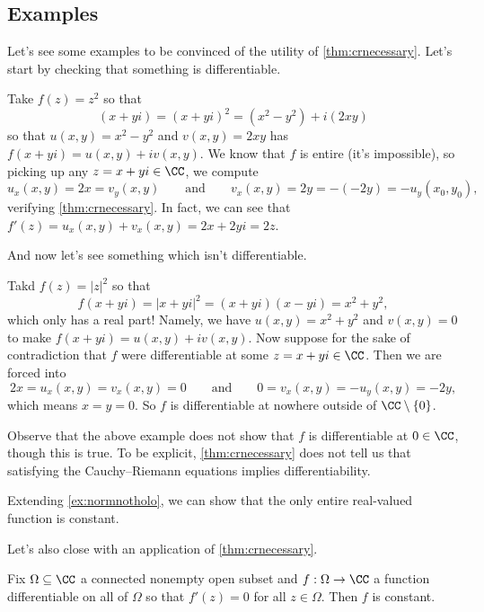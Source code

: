 \subsection{Examples}
Let's see some examples to be convinced of the utility of \autoref{thm:crnecessary}. Let's start by checking that something is differentiable.
\begin{example}
	Take $f(z)=z^2$ so that 
	\[(x+yi)=(x+yi)^2=\left(x^2-y^2\right)+i(2xy)\]
	so that $u(x,y)=x^2-y^2$ and $v(x,y)=2xy$ has $f(x+yi)=u(x,y)+iv(x,y)$. We know that $f$ is entire (it's impossible), so picking up any $z=x+yi\in\CC$, we compute
	\[u_x(x,y)=2x=v_y(x,y)\qquad\text{and}\qquad v_x(x,y)=2y=-(-2y)=-u_y(x_0,y_0),\]
	verifying \autoref{thm:crnecessary}. In fact, we can see that $f'(z)=u_x(x,y)+v_x(x,y)=2x+2yi=2z$.
\end{example}
And now let's see something which isn't differentiable.
\begin{example} \label{ex:normnotholo}
	Takd $f(z)=|z|^2$ so that
	\[f(x+yi)=|x+yi|^2=(x+yi)(x-yi)=x^2+y^2,\]
	which only has a real part! Namely, we have $u(x,y)=x^2+y^2$ and $v(x,y)=0$ to make $f(x+yi)=u(x,y)+iv(x,y)$. Now suppose for the sake of contradiction that $f$ were differentiable at some $z=x+yi\in\CC$. Then we are forced into
	\[2x=u_x(x,y)=v_x(x,y)=0\qquad\text{and}\qquad0=v_x(x,y)=-u_y(x,y)=-2y,\]
	which means $x=y=0$. So $f$ is differentiable at nowhere outside of $\CC\setminus\{0\}$.
\end{example}
Observe that the above example does not show that $f$ is differentiable at $0\in\CC$, though this is true. To be explicit, \autoref{thm:crnecessary} does not tell us that satisfying the Cauchy--Riemann equations implies differentiability.
\begin{remark}
	Extending \autoref{ex:normnotholo}, we can show that the only entire real-valued function is constant.
\end{remark}
Let's also close with an application of \autoref{thm:crnecessary}.
\begin{corollary}
	Fix $\Omega\subseteq\CC$ a connected nonempty open subset and $f:\Omega\to\CC$ a function differentiable on all of $\Omega$ so that $f'(z)=0$ for all $z\in\Omega$. Then $f$ is constant.
\end{corollary}
